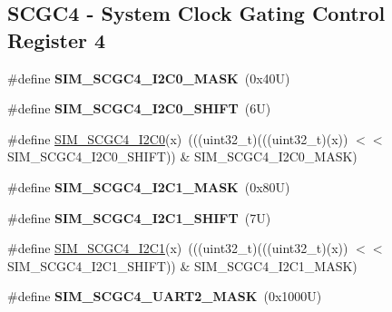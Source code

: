\subsection*{S\+C\+G\+C4 -\/ System Clock Gating Control Register 4}
\begin{DoxyCompactItemize}
\item 
\mbox{\label{group___s_i_m___register___masks_ga55fc2bdfb36e61b4771015749307c480}} 
\#define {\bfseries S\+I\+M\+\_\+\+S\+C\+G\+C4\+\_\+\+I2\+C0\+\_\+\+M\+A\+SK}~(0x40\+U)
\item 
\mbox{\label{group___s_i_m___register___masks_ga50185bca8ae97e6b0b0a70541757680b}} 
\#define {\bfseries S\+I\+M\+\_\+\+S\+C\+G\+C4\+\_\+\+I2\+C0\+\_\+\+S\+H\+I\+FT}~(6\+U)
\item 
\#define \mbox{\hyperlink{group___s_i_m___register___masks_ga4922352ee7ec444127df95440453118e}{S\+I\+M\+\_\+\+S\+C\+G\+C4\+\_\+\+I2\+C0}}(x)~(((uint32\+\_\+t)(((uint32\+\_\+t)(x)) $<$$<$ S\+I\+M\+\_\+\+S\+C\+G\+C4\+\_\+\+I2\+C0\+\_\+\+S\+H\+I\+FT)) \& S\+I\+M\+\_\+\+S\+C\+G\+C4\+\_\+\+I2\+C0\+\_\+\+M\+A\+SK)
\item 
\mbox{\label{group___s_i_m___register___masks_gad28d1d702a535531373c915824c34793}} 
\#define {\bfseries S\+I\+M\+\_\+\+S\+C\+G\+C4\+\_\+\+I2\+C1\+\_\+\+M\+A\+SK}~(0x80\+U)
\item 
\mbox{\label{group___s_i_m___register___masks_ga9f7b3fb0b1b7843cdf821b6b9a86ecfb}} 
\#define {\bfseries S\+I\+M\+\_\+\+S\+C\+G\+C4\+\_\+\+I2\+C1\+\_\+\+S\+H\+I\+FT}~(7\+U)
\item 
\#define \mbox{\hyperlink{group___s_i_m___register___masks_ga8382653e8bd89819cf6b34ead07fff6c}{S\+I\+M\+\_\+\+S\+C\+G\+C4\+\_\+\+I2\+C1}}(x)~(((uint32\+\_\+t)(((uint32\+\_\+t)(x)) $<$$<$ S\+I\+M\+\_\+\+S\+C\+G\+C4\+\_\+\+I2\+C1\+\_\+\+S\+H\+I\+FT)) \& S\+I\+M\+\_\+\+S\+C\+G\+C4\+\_\+\+I2\+C1\+\_\+\+M\+A\+SK)
\item 
\mbox{\label{group___s_i_m___register___masks_gaea7b7b8d6abc055026d4ca7299206597}} 
\#define {\bfseries S\+I\+M\+\_\+\+S\+C\+G\+C4\+\_\+\+U\+A\+R\+T2\+\_\+\+M\+A\+SK}~(0x1000\+U)
\item 
\mbox{\label{group___s_i_m___register___masks_gae844b2ce3371466add7387b9ea32bc4c}} 

\end{DoxyCompactItemize}
